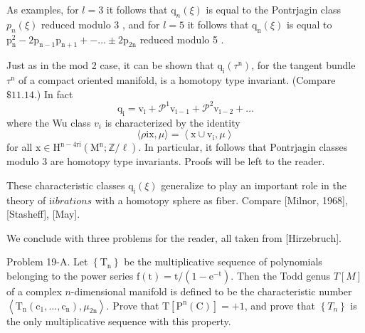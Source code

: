 \documentclass[10pt]{article}
\begin{document}
As examples, for $l=3$ it follows that $\mathrm{q}_{n}(\xi)$ is equal to the Pontrjagin class $p_{n}(\xi)$ reduced modulo 3 , and for $l=5$ it follows that $\mathrm{q}_{\mathrm{n}}(\xi)$ is equal to $\mathrm{p}_{\mathrm{n}}^{2}-2 \mathrm{p}_{\mathrm{n}-1} \mathrm{p}_{\mathrm{n}+1}+-\ldots \pm 2 \mathrm{p}_{2 \mathrm{n}}$ reduced modulo 5 .

Just as in the mod 2 case, it can be shown that $\mathrm{q}_{\mathrm{i}}\left(\tau^{\mathrm{n}}\right)$, for the tangent bundle $\tau^{\mathrm{n}}$ of a compact oriented manifold, is a homotopy type invariant. (Compare $\$ 11.14$.) In fact
$$
\mathrm{q}_{\mathrm{i}}=\mathrm{v}_{\mathrm{i}}+\mathscr{P}^{1} \mathrm{v}_{\mathrm{i}-1}+\mathscr{P}^{2} \mathrm{v}_{\mathrm{i}-2}+\ldots
$$
where the Wu class $v_{i}$ is characterized by the identity
$$
\langle\rho \mathrm{i} \mathrm{x}, \mu\rangle=\left\langle\mathrm{x} \cup \mathrm{v}_{\mathrm{i}}, \mu\right\rangle
$$
for all $\mathrm{x} \in \mathrm{H}^{\mathrm{n}-4 \mathrm{ri}}\left(\mathrm{M}^{\mathrm{n}} ; \mathbb{Z} / \ell\right)$. In particular, it follows that Pontrjagin classes modulo 3 are homotopy type invariants. Proofs will be left to the reader.

These characteristic classes $\mathrm{q}_{\mathrm{i}}(\xi)$ generalize to play an important role in the theory of $\mathrm{i} i b r a t i o n s$ with a homotopy sphere as $\mathrm{fiber}$. Compare [Milnor, 1968], [Stasheff], [May].

We conclude with three problems for the reader, all taken from [Hirzebruch].

Problem 19-A. Let $\left\{\mathrm{T}_{\mathrm{n}}\right\}$ be the multiplicative sequence of polynomials belonging to the power series $\mathrm{f}(\mathrm{t})=\mathrm{t} /\left(1-\mathrm{e}^{-\mathrm{t}}\right)$. Then the Todd genus $T[M]$ of a complex $n$-dimensional manifold is defined to be the characteristic number $\left\langle\mathrm{T}_{\mathrm{n}}\left(\mathrm{c}_{1}, \ldots, \mathrm{c}_{\mathrm{n}}\right), \mu_{2 \mathrm{n}}\right\rangle$. Prove that $\mathrm{T}\left[\mathrm{P}^{\mathrm{n}}(\mathrm{C})\right]=+1$, and prove that $\left\{T_{n}\right\}$ is the only multiplicative sequence with this property.
\end{document}
